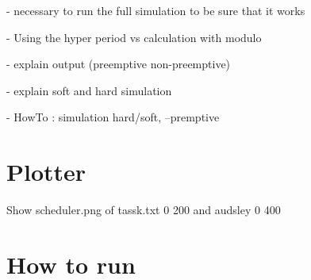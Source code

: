 \documentclass[letterpaper]{article}
\begin{document}
- necessary to run the full simulation to be sure that it works

- Using the hyper period vs calculation with modulo

- explain output (preemptive non-preemptive)

- explain soft and hard simulation

- HowTo : simulation hard/soft, --premptive

\section{Plotter}

Show scheduler.png of tassk.txt 0 200 and audsley 0 400

\section{How to run}

\label{sec:howto}
\end{document}
